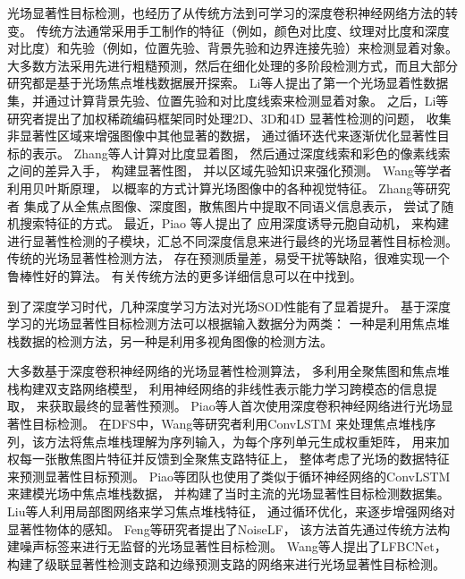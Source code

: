 


光场显著性目标检测，也经历了从传统方法到可学习的深度卷积神经网络方法的转变。
传统方法通常采用手工制作的特征（例如，颜色对比度、纹理对比度和深度对比度）和先验（例如，位置先验、背景先验和边界连接先验）来检测显着对象。 
大多数方法采用先进行粗糙预测，然后在细化处理的多阶段检测方式，而且大部分研究都是基于光场焦点堆栈数据展开探索。
%
%
Li等人提出了第一个光场显着性数据集，并通过计算背景先验、位置先验和对比度线索来检测显着对象。
之后，Li等研究者提出了加权稀疏编码框架同时处理2D、3D和4D 显著性检测的问题，
收集非显著性区域来增强图像中其他显著的数据，
通过循环迭代来逐渐优化显著性目标的表示。
Zhang等人计算对比度显着图，
然后通过深度线索和彩色的像素线索之间的差异入手，
构建显著性图，
并以区域先验知识来强化预测。
Wang等学者利用贝叶斯原理，
以概率的方式计算光场图像中的各种视觉特征。
Zhang等研究者
集成了从全焦点图像、深度图，散焦图片中提取不同语义信息表示，
尝试了随机搜索特征的方式。
最近，Piao 等人提出了
应用深度诱导元胞自动机，
来构建进行显著性检测的子模块，汇总不同深度信息来进行最终的光场显著性目标检测。
传统的光场显著性检测方法，
存在预测质量差，易受干扰等缺陷，很难实现一个鲁棒性好的算法。
有关传统方法的更多详细信息可以在中找到。





到了深度学习时代，几种深度学习方法对光场SOD性能有了显着提升。 
基于深度学习的光场显著性目标检测方法可以根据输入数据分为两类：
一种是利用焦点堆栈数据的检测方法，另一种是利用多视角图像的检测方法。



大多数基于深度卷积神经网络的光场显著性检测算法，
多利用全聚焦图和焦点堆栈构建双支路网络模型，
利用神经网络的非线性表示能力学习跨模态的信息提取，
来获取最终的显著性预测。
Piao等人首次使用深度卷积神经网络进行光场显著性目标检测。
在DFS中，Wang等研究者利用ConvLSTM
来处理焦点堆栈序列，该方法将焦点堆栈理解为序列输入，为每个序列单元生成权重矩阵，
用来加权每一张散焦图片特征并反馈到全聚焦支路特征上，
整体考虑了光场的数据特征来预测显著性目标预测。
Piao等团队也使用了类似于循环神经网络的ConvLSTM来建模光场中焦点堆栈数据，
并构建了当时主流的光场显著性目标检测数据集。
Liu等人利用局部图网络来学习焦点堆栈特征，
通过循环优化，来逐步增强网络对显著性物体的感知。
Feng等研究者提出了NoiseLF，
该方法首先通过传统方法构建噪声标签来进行无监督的光场显著性目标检测。
Wang等人提出了LFBCNet，
构建了级联显著性检测支路和边缘预测支路的网络来进行光场显著性目标检测。




